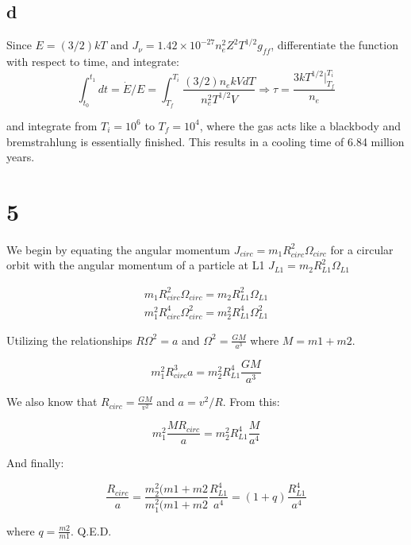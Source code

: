 \documentclass{article}
\begin{document}
\subsection*{d}
Since $E = (3/2)kT$ and $J_{\nu} = 1.42 \times 10^{-27} n_e^2 Z^2 T^{1/2} g_{ff}$, differentiate the function with respect to time, and integrate:
\begin{equation}
\int_{t_0}^{t_1} dt=\dot{E}/E = \int_{T_f}^{T_i} \frac{(3/2) n_e k V dT}{n_e^2 T^{1/2}V} \Rightarrow \tau = \frac{3kT^{1/2}|_{T_f}^{T_i}}{n_e}
\end{equation}

and integrate from $T_i=10^6$ to $T_f =10^4$, where the gas acts like a blackbody and bremstrahlung is essentially finished. This results in a cooling time of 6.84 million years.

\section*{5}

We begin by equating the angular momentum $ J_{circ} = m_1 R_{circ}^2 \Omega_{circ}$ for a circular orbit with the angular momentum of a particle at L1 $ J_{L1} = m_2 R_{L1}^2 \Omega_{L1}$

\begin{align}
m_1 R_{circ}^2 \Omega_{circ} = m_2 R_{L1}^2 \Omega_{L1} \\
m_1^2 R_{circ}^4 \Omega_{circ}^2 = m_2^2 R_{L1}^4 \Omega_{L1}^2
\end{align}

Utilizing the relationships $ R \Omega^2 = a $ and $\Omega^2 = \frac{GM}{a^3}$ where $M = m1 + m2$.

\begin{equation}
m_1^2 R_{circ}^3 a = m_2^2 R_{L1}^4 \frac{GM}{a^3}
\end{equation}

We also know that $R_{circ} = \frac{GM}{v^2}$ and $a = v^2 / R$. From this: 

\begin{equation}
m_1^2 \frac{MR_{circ}}{a} = m_2^2 R_{L1}^4 \frac{M}{a^4}
\end{equation}

And finally:

\begin{equation}
\frac{R_{circ}}{a} = \frac{m_2^2(m1+m2}{m_1^2(m1+m2}  \frac{R_{L1}^4}{a^4} = (1+q)\frac{R_{L1}^4}{a^4}
\end{equation}

where $q=\frac{m2}{m1}$. Q.E.D.
\end{document}
